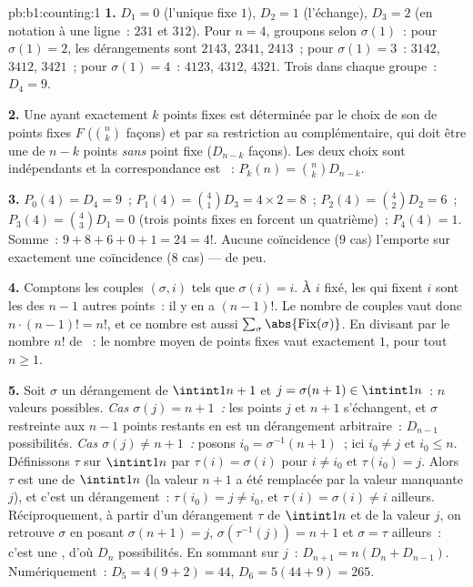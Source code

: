 \begin{solution}{pb:b1:counting:1}
\textbf{1.} $D_1 = 0$ (l'unique  fixe $1$), $D_2 = 1$
(l'échange), $D_3 = 2$ (en notation à une ligne~: $231$ et $312$). Pour
$n = 4$, groupons selon $\sigma(1)$~: pour $\sigma(1) = 2$, les dérangements
sont $2143$, $2341$, $2413$~; pour $\sigma(1) = 3$~: $3142$, $3412$,
$3421$~; pour $\sigma(1) = 4$~: $4123$, $4312$, $4321$. Trois dans chaque
groupe~: $D_4 = 9$.

\textbf{2.} Une  ayant exactement $k$ points fixes est
déterminée par le choix de son  de points fixes $F$ ($\binom nk$
façons) et par sa restriction au complémentaire, qui doit être une
 de $n - k$ points \emph{sans} point fixe ($D_{n-k}$ façons).
Les deux choix sont indépendants et la correspondance est ~:
$P_k(n) = \binom nk D_{n-k}$.

\textbf{3.} $P_0(4) = D_4 = 9$~; $P_1(4) = \binom41 D_3 = 4 \times 2
= 8$~; $P_2(4) = \binom42 D_2 = 6$~; $P_3(4) = \binom43 D_1 = 0$
(trois points fixes en forcent un quatrième)~; $P_4(4) = 1$. Somme~:
$9 + 8 + 6 + 0 + 1 = 24 = 4!$. Aucune coïncidence ($9$ cas) l'emporte sur
exactement une coïncidence ($8$ cas) --- de peu.

\textbf{4.} Comptons les couples $(\sigma, i)$ tels que $\sigma(i) = i$. À
$i$ fixé, les  qui fixent $i$ sont les  des
$n - 1$ autres points~: il y en a $(n-1)!$. Le nombre de couples vaut
donc $n \cdot (n-1)! = n!$, et ce nombre est aussi
$\sum_\sigma \abs{\mathrm{Fix}(\sigma)}$. En divisant par le nombre
$n!$ de ~: le nombre moyen de points fixes vaut
exactement $1$, pour tout $n \geq 1$.

\textbf{5.} Soit $\sigma$ un dérangement de $\intint1{n+1}$ et
$j = \sigma(n+1) \in \intint1n$~: $n$ valeurs possibles. \emph{Cas
$\sigma(j) = n+1$~:} les points $j$ et $n+1$ s'échangent, et $\sigma$
restreinte aux $n - 1$ points restants en est un dérangement
arbitraire~: $D_{n-1}$ possibilités. \emph{Cas $\sigma(j)
\neq n+1$~:} posons $i_0 = \sigma^{-1}(n+1)$~; ici $i_0 \neq j$ et
$i_0 \leq n$. Définissons $\tau$ sur $\intint1n$ par $\tau(i) = \sigma(i)$
pour $i \neq i_0$ et $\tau(i_0) = j$. Alors $\tau$ est une 
de $\intint1n$ (la valeur $n+1$ a été remplacée par la valeur manquante
$j$), et c'est un dérangement~: $\tau(i_0) = j \neq i_0$, et
$\tau(i) = \sigma(i) \neq i$ ailleurs. Réciproquement, à partir d'un
dérangement $\tau$ de $\intint1n$ et de la valeur $j$, on retrouve
$\sigma$ en posant $\sigma(n+1) = j$, $\sigma(\tau^{-1}(j)) = n+1$
et $\sigma = \tau$ ailleurs~: c'est une , d'où $D_n$
possibilités. En sommant sur $j$~: $D_{n+1} = n(D_n + D_{n-1})$.
Numériquement~: $D_5 = 4(9 + 2) = 44$, $D_6 = 5(44 + 9) = 265$.


\end{solution}
